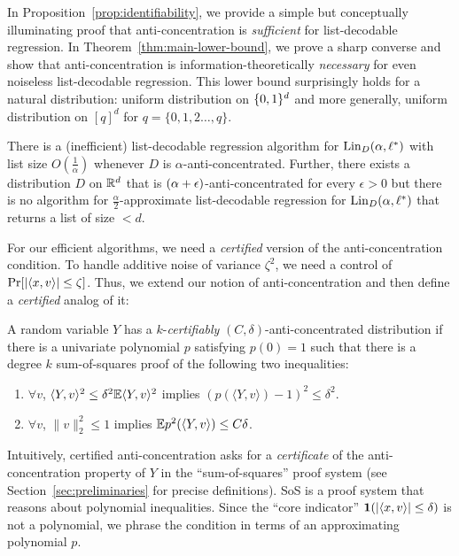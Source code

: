 In Proposition~\ref{prop:identifiability}, we provide a simple but conceptually illuminating proof that anti-concentration is \emph{sufficient} for list-decodable regression. In Theorem~\ref{thm:main-lower-bound}, we prove a sharp converse and show that anti-concentration is information-theoretically \emph{necessary} for even noiseless list-decodable regression. This lower bound surprisingly holds for a natural distribution: uniform distribution on $\{0,1\}^d$ and more generally, uniform distribution on $[q]^d$ for  $q = \{0,1,2\ldots,q\}$.

\begin{theorem}
There is a (inefficient) list-decodable regression algorithm for $\mathrm{Lin}_D(\alpha,\ell^*)$ with list size $O(\frac{1}{\alpha})$ whenever $D$ is $\alpha$-anti-concentrated. 
Further, there exists a distribution $D$ on $\mathbb R^d$ that is $(\alpha+\epsilon)$-anti-concentrated for every $\epsilon >0$ but there is no algorithm for $\frac{\alpha}{2}$-approximate list-decodable regression for $\mathrm{Lin}_D(\alpha,\ell^*)$  that returns a list of size $<d$. 
\end{theorem}
For our efficient algorithms, we need a \emph{certified} version of the anti-concentration condition. 
To handle additive noise of variance $\zeta^2$, we need a control of $\Pr[ |\langle x,v\rangle| \leq \zeta]$. 
Thus, we extend our notion of anti-concentration and then define a \emph{certified} analog of it:
\begin{definition} \label{def:certified-anti-concentration}
A random variable $Y$ has a $k$-\emph{certifiably} $(C,\delta)$-anti-concentrated distribution if there is a univariate polynomial $p$ satisfying $p(0) = 1$ such that there is a degree $k$ sum-of-squares proof of the following two inequalities: 
\begin{enumerate} 
\item $\forall v$, $\langle Y,v\rangle^2 \leq \delta^2 \mathbb{E} \langle Y,v\rangle^2$ implies $(p(\langle Y,v\rangle) -1)^2\leq \delta^2$.
\item $\forall v$, $\|v\|_2^2 \leq 1$ implies  $\mathbb{E} p^2(\left \langle Y,v\rangle \right) \leq C\delta$.
\end{enumerate}
\end{definition} 
Intuitively, certified anti-concentration asks for a \emph{certificate} of the anti-concentration property of $Y$ in the ``sum-of-squares'' proof system (see Section~\ref{sec:preliminaries} for precise definitions). SoS is a proof system that reasons about  polynomial inequalities. Since the ``core indicator'' $\bm{1}(|\langle x,v\rangle| \leq \delta)$ is not a polynomial, we phrase the condition in terms of an approximating polynomial $p$.
